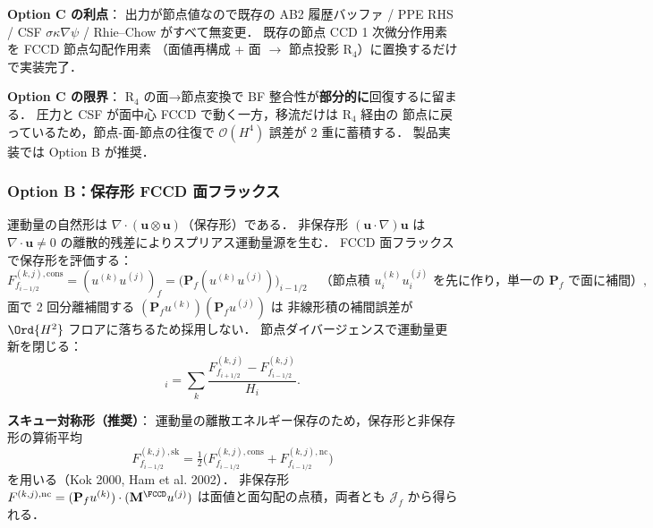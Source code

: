 \noindent\textbf{Option C の利点}：
出力が節点値なので既存の AB2 履歴バッファ / PPE RHS /
CSF $\sigma\kappa\nabla\psi$ / Rhie--Chow がすべて無変更．
既存の節点 CCD 1 次微分作用素を FCCD 節点勾配作用素
（面値再構成 + 面 $\to$ 節点投影 R$_4$）に置換するだけで実装完了．

\noindent\textbf{Option C の限界}：
R$_4$ の面→節点変換で BF 整合性が\textbf{部分的に}回復するに留まる．
圧力と CSF が面中心 FCCD で動く一方，移流だけは R$_4$ 経由の
節点に戻っているため，節点-面-節点の往復で
$\mathcal{O}(H^4)$ 誤差が 2 重に蓄積する．
製品実装では Option B が推奨．

\subsubsection{Option B：保存形 FCCD 面フラックス}
\label{sec:fccd_adv_option_b}

運動量の自然形は $\nabla\cdot(\mathbf{u}\otimes\mathbf{u})$（保存形）である．
非保存形 $(\mathbf{u}\cdot\nabla)\mathbf{u}$ は $\nabla\cdot\mathbf{u}\neq 0$
の離散的残差によりスプリアス運動量源を生む．
FCCD 面フラックスで保存形を評価する：
\begin{equation}
  F^{(k,j),\text{cons}}_{f_{i-1/2}}
  = (u^{(k)} u^{(j)})_f
  = \bigl(\mathbf{P}_f(u^{(k)} u^{(j)})\bigr)_{i-1/2}
  \quad\text{（節点積 $u^{(k)}_i u^{(j)}_i$ を先に作り，単一の $\mathbf{P}_f$ で面に補間）},
  \label{eq:fccd_adv_flux_cons}
\end{equation}
面で 2 回分離補間する $(\mathbf{P}_f u^{(k)})(\mathbf{P}_f u^{(j)})$ は
非線形積の補間誤差が $\Ord{H^2}$ フロアに落ちるため採用しない．
節点ダイバージェンスで運動量更新を閉じる：
\begin{equation}
  [\nabla\cdot F^{(j)}]_i
  = \sum_k\frac{F^{(k,j)}_{f_{i+1/2}} - F^{(k,j)}_{f_{i-1/2}}}{H_i}.
  \label{eq:fccd_adv_divergence}
\end{equation}

\noindent\textbf{スキュー対称形（推奨）}：
運動量の離散エネルギー保存のため，保存形と非保存形の算術平均
\begin{equation}
  F^{(k,j),\text{sk}}_{f_{i-1/2}}
  = \tfrac{1}{2}\bigl(F^{(k,j),\text{cons}}_{f_{i-1/2}}
  + F^{(k,j),\text{nc}}_{f_{i-1/2}}\bigr)
  \label{eq:fccd_adv_flux_skew}
\end{equation}
を用いる（Kok 2000, Ham et al. 2002）．
非保存形 $F^{(k,j),\text{nc}} = (\mathbf{P}_f u^{(k)})\cdot(\mathbf{M}^{\FCCD}u^{(j)})$
は面値と面勾配の点積，両者とも $\mathcal{J}_f$ から得られる．

